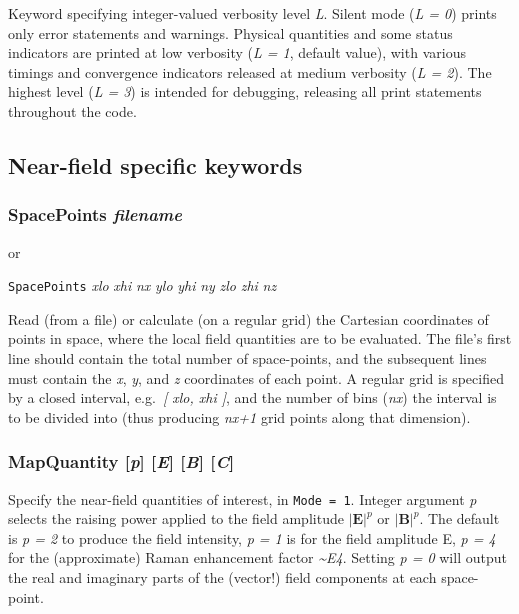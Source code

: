 \documentclass[
]{article}
\begin{document}
Keyword specifying integer-valued verbosity level \emph{L}. Silent mode
(\emph{L = 0}) prints only error statements and warnings. Physical
quantities and some status indicators are printed at low verbosity
(\emph{L = 1}, default value), with various timings and convergence
indicators released at medium verbosity (\emph{L = 2}). The highest
level (\emph{L = 3}) is intended for debugging, releasing all print
statements throughout the code.

\hypertarget{near-field-specific-keywords}{%
\subsection{Near-field specific
keywords}\label{near-field-specific-keywords}}

\hypertarget{spacepoints-filename}{%
\subsubsection{\texorpdfstring{SpacePoints
\emph{filename}}{SpacePoints filename}}\label{spacepoints-filename}}

or

\texttt{SpacePoints} \emph{xlo} \emph{xhi} \emph{nx} \emph{ylo}
\emph{yhi} \emph{ny} \emph{zlo} \emph{zhi} \emph{nz}

Read (from a file) or calculate (on a regular grid) the Cartesian
coordinates of points in space, where the local field quantities are to
be evaluated. The file's first line should contain the total number of
space-points, and the subsequent lines must contain the \emph{x},
\emph{y}, and \emph{z} coordinates of each point. A regular grid is
specified by a closed interval, e.g.~\emph{{[} xlo, xhi {]}}, and the
number of bins (\emph{nx}) the interval is to be divided into (thus
producing \emph{nx+1} grid points along that dimension).

\hypertarget{mapquantity-p-e-b-c}{%
\subsubsection{\texorpdfstring{MapQuantity {[}\emph{p}{]} {[}\emph{E}{]}
{[}\emph{B}{]}
{[}\emph{C}{]}}{MapQuantity {[}p{]} {[}E{]} {[}B{]} {[}C{]}}}\label{mapquantity-p-e-b-c}}

Specify the near-field quantities of interest, in \texttt{Mode\ =\ 1}.
Integer argument \emph{p} selects the raising power applied to the field
amplitude \(|\mathbf{E}|^p\) or \(|\mathbf{B}|^p\). The default is
\emph{p = 2} to produce the field intensity, \emph{p = 1} is for the
field amplitude \textbar E\textbar, \emph{p = 4} for the (approximate)
Raman enhancement factor \emph{\textasciitilde\textbar E\textbar{}4}.
Setting \emph{p = 0} will output the real and imaginary parts of the
(vector!) field components at each space-point.
\end{document}
